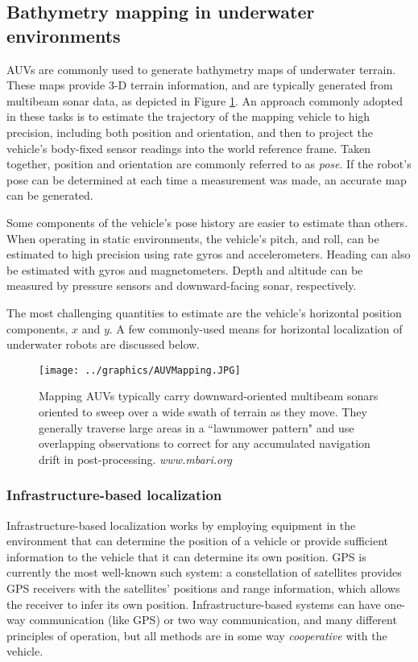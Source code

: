 \subsection{Bathymetry mapping in underwater environments}

AUVs are commonly used to generate bathymetry maps of underwater terrain. These maps provide 3-D terrain information, and are typically generated from multibeam sonar data, as depicted in Figure \ref{fig:AUVbathyMapping}. An approach commonly adopted in these tasks is to estimate the trajectory of the mapping vehicle to high precision, including both position and orientation, and then to project the vehicle's body-fixed sensor readings into the world reference frame. Taken together, position and orientation are commonly referred to as \emph{pose}. If the robot's pose can be determined at each time a measurement was made, an accurate map can be generated. 

Some components of the vehicle's pose history are easier to estimate than others. When operating in static environments, the vehicle's pitch, and roll, can be estimated to high precision using rate gyros and accelerometers. Heading can also be estimated with gyros and magnetometers. Depth and altitude can be measured by pressure sensors and downward-facing sonar, respectively. 

The most challenging quantities to estimate are the vehicle's horizontal position components, $x$ and $y$. A few commonly-used means for horizontal localization of underwater robots are discussed below.

\begin{figure}[!htb]
   \centering
   \texttt{[image: ../graphics/AUVMapping.JPG]} %
   \caption{Mapping AUVs typically carry downward-oriented multibeam sonars oriented to sweep over a wide swath of terrain as they move. They generally traverse large areas in a ``lawnmower pattern" and use overlapping observations to correct for any accumulated navigation drift in post-processing. \emph{www.mbari.org} }
   \label{fig:AUVbathyMapping}
\end{figure}

\subsubsection{Infrastructure-based localization}

Infrastructure-based localization works by employing equipment in the environment that can determine the position of a vehicle or provide sufficient information to the vehicle that it can determine its own position. GPS is currently the most well-known such system: a constellation of satellites provides GPS receivers with the satellites' positions and range information, which allows the receiver to infer its own position. Infrastructure-based systems can have one-way communication (like GPS) or two way communication, and many different principles of operation, but all methods are in some way \emph{cooperative} with the vehicle. 


